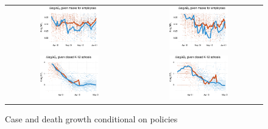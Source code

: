 \documentclass[11pt,reqno,letter]{amsart}
\theoremstyle{definition}
\begin{document}
\begin{figure}
  \caption{Case and death growth conditional on policies \label{fig:growthpolicies1}}
  \begin{minipage}{\linewidth}
    \centering
    \begin{tabular}{cc}
      \includegraphics[width=0.483\textwidth]{tables_and_figures/pmaskbus-cases-14}
      &
        \includegraphics[width=0.483\textwidth]{tables_and_figures/pmaskbus-deaths-21}
      \\
      \includegraphics[width=0.483\textwidth]{tables_and_figures/pk12-cases-14}
      &
        \includegraphics[width=0.483\textwidth]{tables_and_figures/pk12-deaths-21}

\end{tabular}
\end{minipage}
\end{figure}
\end{document}
